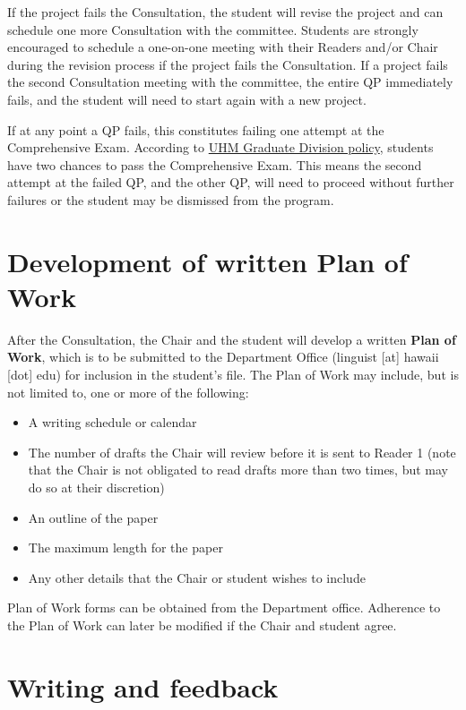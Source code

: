 \documentclass[
]{book}
\providecommand{\tightlist}{%
  \setlength{\itemsep}{0pt}\setlength{\parskip}{0pt}}
\begin{document}
If the project fails the Consultation, the student will revise the project and can schedule one more Consultation with the committee. Students are strongly encouraged to schedule a one-on-one meeting with their Readers and/or Chair during the revision process if the project fails the Consultation. If a project fails the second Consultation meeting with the committee, the entire QP immediately fails, and the student will need to start again with a new project.

If at any point a QP fails, this constitutes failing one attempt at the Comprehensive Exam. According to \href{http://www.manoa.hawaii.edu/graduate/content/doctorate}{UHM Graduate Division policy}, students have two chances to pass the Comprehensive Exam. This means the second attempt at the failed QP, and the other QP, will need to proceed without further failures or the student may be dismissed from the program.

\section{Development of written Plan of Work}\label{workplan}

After the Consultation, the Chair and the student will develop a written \textbf{Plan of Work}, which is to be submitted to the Department Office (linguist {[}at{]} hawaii {[}dot{]} edu) for inclusion in the student's file. The Plan of Work may include, but is not limited to, one or more of the following:

\begin{itemize}
\tightlist
\item
  A writing schedule or calendar
\item
  The number of drafts the Chair will review before it is sent to Reader 1 (note that the Chair is not obligated to read drafts more than two times, but may do so at their discretion)
\item
  An outline of the paper
\item
  The maximum length for the paper
\item
  Any other details that the Chair or student wishes to include
\end{itemize}

Plan of Work forms can be obtained from the Department office. Adherence to the Plan of Work can later be modified if the Chair and student agree.

\section{Writing and feedback}\label{feedback}
\end{document}
